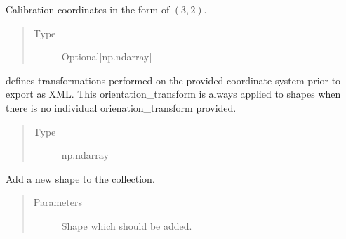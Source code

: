 \documentclass[a4paper,10pt,english,openany,oneside]{sphinxmanual}
\begin{document}
\begin{fulllineitems}

\begin{fulllineitems}
\label{\detokenize{pages/modules:lmd.lib.Collection.calibration_points}}
\sphinxAtStartPar
Calibration coordinates in the form of \((3, 2)\).
\begin{quote}\begin{description}
\item[{Type}] \leavevmode
\sphinxAtStartPar
Optional{[}np.ndarray{]}

\end{description}\end{quote}

\end{fulllineitems}


\begin{fulllineitems}
\label{\detokenize{pages/modules:lmd.lib.Collection.orientation_transform}}
\sphinxAtStartPar
defines transformations performed on the provided coordinate system prior to export as XML. This orientation\_transform is always applied to shapes when there is no individual orienation\_transform provided.
\begin{quote}\begin{description}
\item[{Type}] \leavevmode
\sphinxAtStartPar
np.ndarray

\end{description}\end{quote}

\end{fulllineitems}


\begin{fulllineitems}
\label{\detokenize{pages/modules:lmd.lib.Collection.add_shape}}
\sphinxAtStartPar
Add a new shape to the collection.
\begin{quote}\begin{description}
\item[{Parameters}] \leavevmode
\sphinxAtStartPar
{} \textendash{} Shape which should be added.


\end{description}
\end{quote}
\end{fulllineitems}
\end{fulllineitems}
\end{document}
